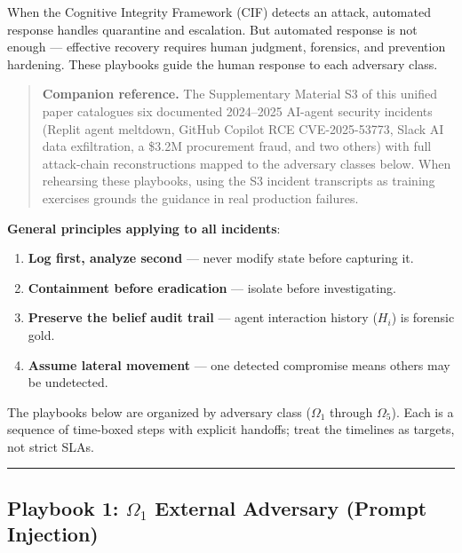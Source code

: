 \documentclass[
]{article}
\providecommand{\tightlist}{%
  \setlength{\itemsep}{0pt}\setlength{\parskip}{0pt}}
\begin{document}
When the Cognitive Integrity Framework (CIF) detects an attack,
automated response handles quarantine and escalation. But automated
response is not enough --- effective recovery requires human judgment,
forensics, and prevention hardening. These playbooks guide the human
response to each adversary class.

\begin{quote}
\textbf{Companion reference.} The Supplementary Material S3 of this
unified paper catalogues six documented 2024--2025 AI-agent security
incidents (Replit agent meltdown, GitHub Copilot RCE CVE-2025-53773,
Slack AI data exfiltration, a \$3.2M procurement fraud, and two others)
with full attack-chain reconstructions mapped to the adversary classes
below. When rehearsing these playbooks, using the S3 incident
transcripts as training exercises grounds the guidance in real
production failures.
\end{quote}

\textbf{General principles applying to all incidents}:

\begin{enumerate}
\def\labelenumi{\arabic{enumi}.}
\tightlist
\item
  \textbf{Log first, analyze second} --- never modify state before
  capturing it.
\item
  \textbf{Containment before eradication} --- isolate before
  investigating.
\item
  \textbf{Preserve the belief audit trail} --- agent interaction history
  (\(H_i\)) is forensic gold.
\item
  \textbf{Assume lateral movement} --- one detected compromise means
  others may be undetected.
\end{enumerate}

The playbooks below are organized by adversary class (\(\Omega_1\)
through \(\Omega_5\)). Each is a sequence of time-boxed steps with
explicit handoffs; treat the timelines as targets, not strict SLAs.

\begin{center}\rule{0.5\linewidth}{0.5pt}\end{center}

\subsection{\texorpdfstring{Playbook 1: \(\Omega_1\) External Adversary
(Prompt
Injection)}{Playbook 1: Omega_1 External Adversary (Prompt Injection)}}\label{playbook-1-omega_1-external-adversary-prompt-injection}
\end{document}
